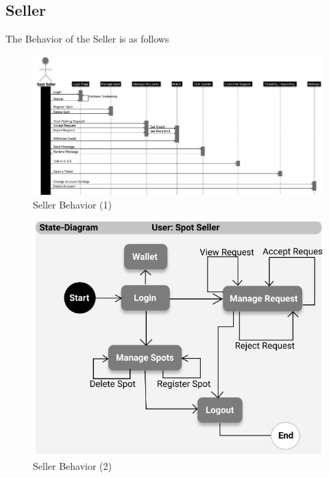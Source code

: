         \pagebreak
        \clearpage
        

    \subsection{Seller}
        The Behavior of the Seller is as follows
        \begin{figure}[h]
            \centering
            \includegraphics[width=1\textwidth]{images/sellerBehaviour.png}
            \caption{Seller Behavior (1)}
            \label{fig:sellerBehaviour}
        \end{figure}

        \pagebreak

        \begin{figure}[h]
            \centering
            \includegraphics[width=1\textwidth]{images/sellerBehaviour2.png}
            \caption{Seller Behavior (2)}
            \label{fig:sellerBehaviour2}
        \end{figure}


